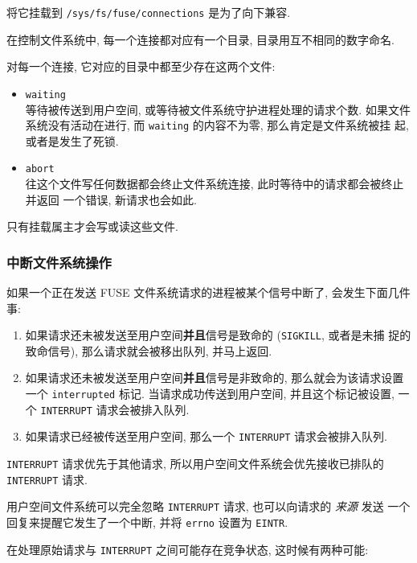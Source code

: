 \documentclass[nofonts]{ctexart}
\begin{document}
将它挂载到 \texttt{/sys/fs/fuse/connections} 是为了向下兼容.

在控制文件系统中, 每一个连接都对应有一个目录, 目录用互不相同的数字命名.

对每一个连接, 它对应的目录中都至少存在这两个文件:

\begin{itemize}
\item
  \texttt{waiting}\\等待被传送到用户空间,
  或等待被文件系统守护进程处理的请求个数. 如果文件 系统没有活动在进行,
  而 \texttt{waiting} 的内容不为零, 那么肯定是文件系统被挂 起,
  或者是发生了死锁.
\item
  \texttt{abort}\\往这个文件写任何数据都会终止文件系统连接,
  此时等待中的请求都会被终止并返回 一个错误, 新请求也会如此.
\end{itemize}

只有挂载属主才会写或读这些文件.

\subsubsection{中断文件系统操作}\label{ux4e2dux65adux6587ux4ef6ux7cfbux7edfux64cdux4f5c}

如果一个正在发送 FUSE 文件系统请求的进程被某个信号中断了,
会发生下面几件事:

\begin{enumerate}
\def\labelenumi{\arabic{enumi}.}
\item
  如果请求还未被发送至用户空间\textbf{并且}信号是致命的
  (\texttt{SIGKILL}, 或者是未捕 捉的致命信号), 那么请求就会被移出队列,
  并马上返回.
\item
  如果请求还未被发送至用户空间\textbf{并且}信号是非致命的,
  那么就会为该请求设置 一个 \texttt{interrupted} 标记.
  当请求成功传送到用户空间, 并且这个标记被设置, 一 个 \texttt{INTERRUPT}
  请求会被排入队列.
\item
  如果请求已经被传送至用户空间, 那么一个 \texttt{INTERRUPT}
  请求会被排入队列.
\end{enumerate}

\texttt{INTERRUPT} 请求优先于其他请求,
所以用户空间文件系统会优先接收已排队的 \texttt{INTERRUPT} 请求.

用户空间文件系统可以完全忽略 \texttt{INTERRUPT} 请求, 也可以向请求的
\emph{来源} 发送 一个回复来提醒它发生了一个中断, 并将 \texttt{errno}
设置为 \texttt{EINTR}.

在处理原始请求与 \texttt{INTERRUPT} 之间可能存在竞争状态,
这时候有两种可能:
\end{document}
